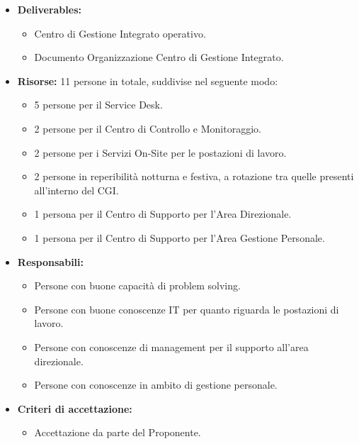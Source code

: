                         
                        \begin{itemize}
               		\item  \textbf{Deliverables:} 
                    \begin{itemize}
                    	\item Centro di Gestione Integrato operativo.
                        \item Documento Organizzazione Centro di Gestione Integrato.
                    \end{itemize}
                                       
                    \item  \textbf{Risorse:} 11 persone in totale, suddivise nel seguente modo: 
                    \begin{itemize}
                    	\item 5 persone per il Service Desk.
                        \item 2 persone per il Centro di Controllo e Monitoraggio.
                        \item 2 persone per i Servizi On-Site per le postazioni di lavoro.
                        \item 2 persone in reperibilità notturna e festiva, a rotazione tra quelle presenti all'interno del CGI.
                        \item 1 persona per il Centro di Supporto per l'Area Direzionale.
                        \item 1 persona per il Centro di Supporto per l'Area Gestione Personale.
                	\end{itemize}
                    \item  \textbf{Responsabili:} 
                    \begin{itemize}
                    	\item Persone con buone capacità di problem solving.
                        \item Persone con buone conoscenze IT per quanto riguarda le postazioni di lavoro.
                        \item Persone con conoscenze di management per il supporto all'area direzionale.
                        \item Persone con conoscenze in ambito di gestione personale.
                    \end{itemize}
                    \item  \textbf{Criteri di accettazione:} 
                    \begin{itemize}
                        \item Accettazione da parte del Proponente.
                    \end{itemize}
                	\end{itemize}
                
